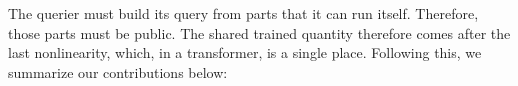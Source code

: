 The querier must build its query from parts that it can run itself. Therefore, those parts must
be public. The shared trained quantity therefore comes after the last nonlinearity,
which, in a transformer, is a single place. Following this, we summarize our contributions below: 






